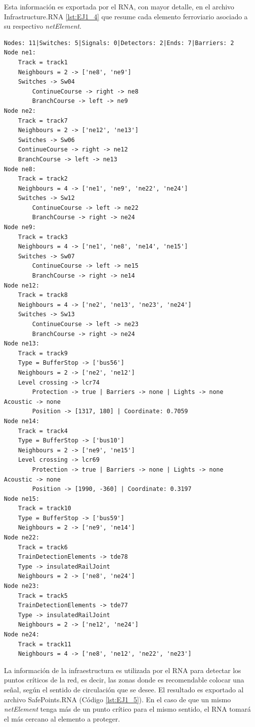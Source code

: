 	Esta información es exportada por el RNA, con mayor detalle, en el archivo Infrastructure.RNA \ref{lst:EJ1_4} que resume cada elemento ferroviario asociado a su respectivo \textit{netElement}.
	
	\begin{lstlisting}[language = {}, caption = Infrastructure.RNA, label = {lst:EJ1_4}]
Nodes: 11|Switches: 5|Signals: 0|Detectors: 2|Ends: 7|Barriers: 2
Node ne1:
	Track = track1
	Neighbours = 2 -> ['ne8', 'ne9']
	Switches -> Sw04
		ContinueCourse -> right -> ne8
		BranchCourse -> left -> ne9
Node ne2:
	Track = track7
	Neighbours = 2 -> ['ne12', 'ne13']
	Switches -> Sw06
	ContinueCourse -> right -> ne12
	BranchCourse -> left -> ne13
Node ne8:
	Track = track2
	Neighbours = 4 -> ['ne1', 'ne9', 'ne22', 'ne24']
	Switches -> Sw12
		ContinueCourse -> left -> ne22
		BranchCourse -> right -> ne24
Node ne9:
	Track = track3
	Neighbours = 4 -> ['ne1', 'ne8', 'ne14', 'ne15']
	Switches -> Sw07
		ContinueCourse -> left -> ne15
		BranchCourse -> right -> ne14
Node ne12:
	Track = track8
	Neighbours = 4 -> ['ne2', 'ne13', 'ne23', 'ne24']
	Switches -> Sw13
		ContinueCourse -> left -> ne23
		BranchCourse -> right -> ne24
Node ne13:
	Track = track9
	Type = BufferStop -> ['bus56']
	Neighbours = 2 -> ['ne2', 'ne12']
	Level crossing -> lcr74
		Protection -> true | Barriers -> none | Lights -> none Acoustic -> none
		Position -> [1317, 180] | Coordinate: 0.7059
Node ne14:
	Track = track4
	Type = BufferStop -> ['bus10']
	Neighbours = 2 -> ['ne9', 'ne15']
	Level crossing -> lcr69
		Protection -> true | Barriers -> none | Lights -> none Acoustic -> none
		Position -> [1990, -360] | Coordinate: 0.3197
Node ne15:
	Track = track10
	Type = BufferStop -> ['bus59']
	Neighbours = 2 -> ['ne9', 'ne14']
Node ne22:
	Track = track6
	TrainDetectionElements -> tde78
	Type -> insulatedRailJoint
	Neighbours = 2 -> ['ne8', 'ne24']
Node ne23:
	Track = track5
	TrainDetectionElements -> tde77
	Type -> insulatedRailJoint
	Neighbours = 2 -> ['ne12', 'ne24']
Node ne24:
	Track = track11
	Neighbours = 4 -> ['ne8', 'ne12', 'ne22', 'ne23']
	\end{lstlisting}	
	
	La información de la infraestructura es utilizada por el RNA para detectar los puntos críticos de la red, es decir, las zonas donde es recomendable colocar una señal, según el sentido de circulación que se desee. El resultado es exportado al archivo SafePoints.RNA (Código \ref{lst:EJ1_5}). En el caso de que un mismo \textit{netElement} tenga más de un punto crítico para el mismo sentido, el RNA tomará el más cercano al elemento a proteger.
	
